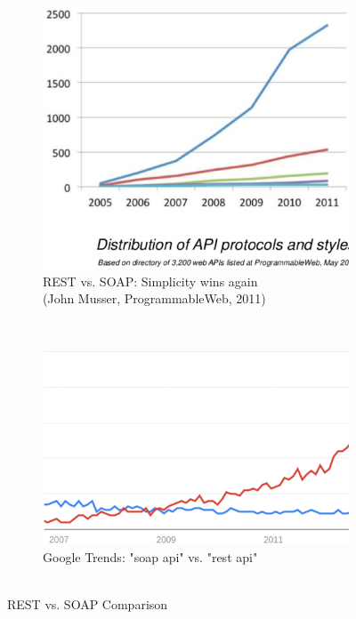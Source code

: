 \begin{figure}[!ht]
	\centering
  \begin{subfigure}[b]{0.5\textwidth}
    \includegraphics[width=\textwidth]{figures/slide-11-1024}
    \caption{REST vs. SOAP: Simplicity wins again\\(John Musser, ProgrammableWeb, 2011)}
    \label{fig:slide-11-1024}
  \end{subfigure}%
  ~
  \begin{subfigure}[b]{0.5\textwidth}
    \includegraphics[width=\textwidth]{figures/googleTrends_Rest-SOAP}
    \caption{Google Trends: "soap api" vs. "rest api"\\~}
    \label{fig:googleTrends_Rest-SOAP}
  \end{subfigure}%
  \caption{REST vs. SOAP Comparison}
  \label{fig:RESTvsSOAP}

\end{figure}

